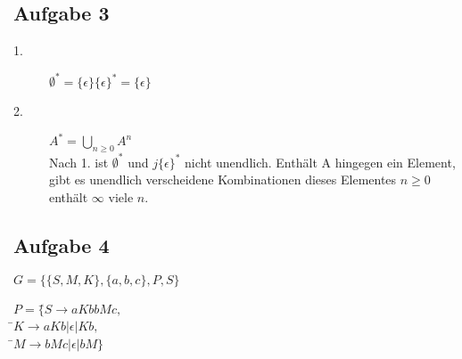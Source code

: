 \documentclass[a4paper]{scrartcl}
\begin{document}
\subsection{Aufgabe 3} %
\label{sub:Aufgabe 3}
\begin{description}
  \item[1.] $ \emptyset^* = \{\epsilon\} \{\epsilon\}^* = \{\epsilon\} $
  \item[2.] $  A ^ * = \bigcup _ { n \geq 0 }  A^n $\\
    Nach 1. ist $\emptyset^*$ und $j\{\epsilon\}^*$ nicht unendlich. Enthält A hingegen ein Element, gibt es unendlich verscheidene Kombinationen dieses Elementes $n\geq0$ enthält $\infty$ viele $n$.
\end{description}

\subsection{Aufgabe 4} %
\label{sub:Aufgabe 4}
$ G =  \{\{S,M,K\},\{a,b,c\}, P, S\} $ \\
\begin{tabbing}

$ P = \{ $\=$ S \rightarrow aKbbMc, $\\
         \=$ K \rightarrow aKb | \epsilon | Kb, $\\
         \=$ M \rightarrow bMc | \epsilon | bM \} $
\end{tabbing}
\end{document}
